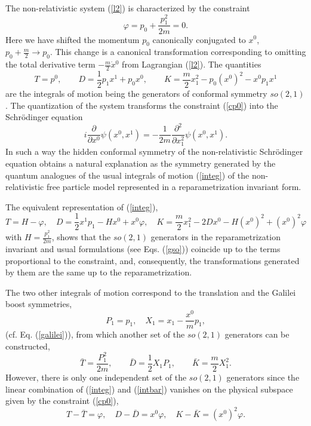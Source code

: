 \documentclass[a4paper,12pt]{article}
\begin{document}
The non-relativistic system
(\ref{l2}) is characterized by the
constraint
\begin{equation}
\varphi=p_0+\frac{p_1^2}{2m}=0.
\label{cp0}
\end{equation}
Here we have shifted the momentum $p_0$
canonically conjugated to $x^0$,
$p_0+\frac{m}{2}\rightarrow p_0$.
This change is a canonical transformation
corresponding to omitting
the
total derivative term $-\frac{m}{2}\dot{x}{}^0$
from Lagrangian (\ref{l2}).
The quantities
\begin{equation}
T=p^0,\qquad D=\frac{1}{2}p_1x^1+p_0x^0,\qquad
K=\frac{m}{2}x_1^2-p_0(x^0)^2-x^0p_1x^1
\label{integ}
\end{equation}
are the integrals of motion being the generators
of conformal symmetry $so(2,1)$.
The quantization of the system
transforms the constraint (\ref{cp0})
into the Schr\"odinger
equation
\[
i\frac{\partial}{\partial x^0}\psi(x^0,x^1)=
-\frac{1}{2m}\frac{\partial^2}{\partial x_1^2}
\psi(x^0,x^1).
\]
In
such a way the hidden conformal symmetry of the
non-relativistic Schr\"odinger
equation \cite{BaRa}
obtains a
natural explanation as the symmetry
generated by the quantum
analogues of the usual integrals of motion
(\ref{integ})
of the non-relativistic free particle model
represented in a reparametrization invariant form.

The  equivalent representation of (\ref{integ}),
$$
T=H-\varphi,\quad
D=\frac{1}{2}x^1p_1-Hx^0+x^0\varphi,\quad
K=\frac{m}{2}x_1^2-2Dx^0-H(x^0)^2+(x^0)^2\varphi
$$
with $H=\frac{p_1^2}{2m}$,
shows that the
$so(2,1)$ generators in the
reparametrization
invariant
and usual formulations (see Eqs. (\ref{gso}))
coincide up to the terms proportional to the constraint,
and, consequently,
the transformations generated by them
are the same up to the reparametrization.

The two other integrals of motion correspond to the
translation
and the Galilei boost symmetries,
\begin{equation}
P_1=p_1,\quad
X_1=x_1-\frac{x^0}{m}p_1,
\label{galican}
\end{equation}
(cf. Eq. (\ref{galilei})),
from which another set of the
$so(2,1)$ generators
can be constructed,
\begin{equation}
\bar T=\frac{P_1^2}{2m},\qquad
\bar D=\frac{1}{2}X_1P_1,\qquad
\bar K=\frac{m}{2}X_1^2.
\label{intbar}
\end{equation}
However, there is only one independent set
of the $so(2,1)$ generators since the linear
combination of
(\ref{integ}) and (\ref{intbar})
vanishes on the physical subspace given
by the constraint (\ref{cp0}),
$$
T-\bar T=\varphi,\quad
D-\bar D=x^0\varphi,\quad
K-\bar K=(x^0)^2\varphi.
$$
\end{document}
